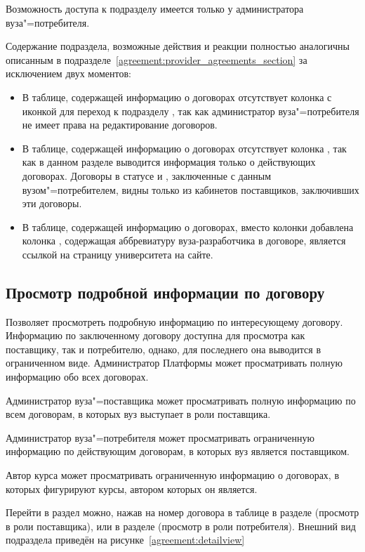 Возможность доступа к подразделу имеется только у администратора вуза"=потребителя.

Содержание подраздела, возможные действия и реакции полностью аналогичны описанным в подразделе~\ref{agreement:provider_agreements_section} за исключением двух моментов:
\begin{itemize}
	\item В таблице, содержащей информацию о договорах отсутствует колонка с иконкой для переход к подразделу  , так как администратор вуза"=потребителя не имеет права на редактирование договоров.
	\item В таблице, содержащей информацию о договорах отсутствует колонка , так как в данном разделе выводится информация только о действующих договорах. Договоры в статусе  и , заключенные с данным вузом"=потребителем, видны только из кабинетов поставщиков, заключивших эти договоры.
	\item В таблице, содержащей информацию о договорах, вместо колонки  добавлена колонка , содержащая аббревиатуру вуза-разработчика в договоре, является ссылкой на страницу университета на сайте.
\end{itemize}


\subsection{Просмотр подробной информации по договору}
Позволяет просмотреть подробную  информацию по интересующему договору. Информацию по заключенному договору доступна для просмотра как поставщику, так и потребителю, однако, для последнего она выводится в ограниченном виде.
Администратор Платформы может просматривать полную информацию обо всех договорах.

Администратор вуза"=поставщика может просматривать полную информацию по всем договорам, в которых вуз выступает в роли поставщика.

Администратор  вуза"=потребителя может просматривать ограниченную информацию по действующим договорам, в которых вуз является поставщиком.

Автор курса может просматривать ограниченную информацию о договорах, в которых фигурируют курсы, автором которых он является.

Перейти в раздел можно, нажав на номер договора в таблице в разделе  (просмотр в роли поставщика), или в разделе  (просмотр в роли потребителя). Внешний вид подраздела приведён на рисунке~\ref{agreement:detailview}
	
